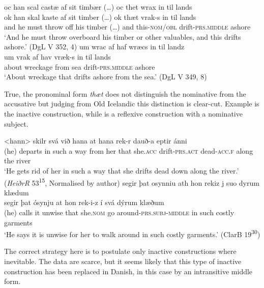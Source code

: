 \documentclass[output=paper]{langscibook}
\begin{document}
\ea \label{ex:heltoft:28} 
\ea 
    \glll  oc han scal castæ af sit timbær (…) oc thet wrax {in til lands}\\
    ok han skal kaste af sit timber (…)     ok     thæt       vrak-s {in til lands}  \\
    and he must throw off his timber (…)   and   this-\textsc{nom/obl}   drift-\textsc{prs.middle}  ashore\\
    \glt ‘And he must throw overboard his timber or other valuables, and this drifts ashore.' (DgL V 352, 4) \label{ex:heltoft:28a}
\ex \label{ex:heltoft:28b} 
    \glll um wrac af haf wræcs {in til landz} \\
    um vrak        af hav     vræk-s         {in til lands}\\
    about wreckage  from sea   drift-\textsc{prs.middle}     ashore\\
    \glt ‘About wreckage that drifts ashore from the sea.' (DgL V 349, 8)  
\z
\z


True, the pronominal form \textit{thæt} does not distinguish the nominative from the accusative but judging from Old Icelandic this distinction is clear-cut. Example  is the inactive construction, while  is a reflexive construction with a nominative subject.

\ea \label{ex:heltoft:29} 
\ea
    \gll <hann> skilr svá við hana          at     hana     rek-r  dauð-a     eptir ánni\\
        (he) departs {in such a way} from her   that  she.\textsc{acc}   drift-\textsc{prs.act} dead-\textsc{acc.f}  along {the river}\\
    \glt ‘He gets rid of her in such a way that she drifts dead down along the river.' (\textit{HeiðrR} 53\textsuperscript{15}, Normalised by author) \label{ex:heltoft:29a}
\ex \label{ex:heltoft:29b}
    \glll segir þat osynniu   ath hon rekiz j suo dyrum klædum\\
          segir þat ósynju    at     hon    rek-i-z  í svá dýrum klæðum\\
          {(he) calls} it unwise   that   she.\textsc{nom}  {go around-\textsc{prs.subj-middle}} in such costly garments\\
    \glt `He says it is unwise for her to walk around in such costly garments.' (ClarB 19\textsuperscript{30})  
\z\z

The correct strategy here is to postulate only inactive constructions where inevitable. The data are scarce, but it seems likely that this type of inactive construction has been replaced in Danish, in this case by an intransitive middle form.
\end{document}
